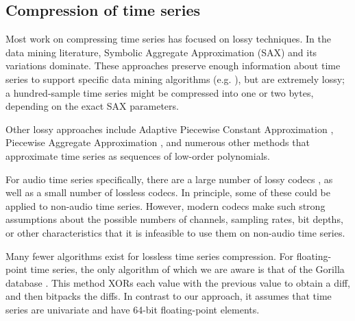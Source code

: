
\subsection{Compression of time series}

Most work on compressing time series has focused on lossy techniques. In the data mining literature, Symbolic Aggregate Approximation (SAX) \cite{SAX} and its variations \cite{isax, isax2} dominate. These approaches preserve enough information about time series to support specific data mining algorithms (e.g. \cite{fastShapelet, hotSax}), but are extremely lossy; a hundred-sample time series might be compressed into one or two bytes, depending on the exact SAX parameters.

Other lossy approaches include Adaptive Piecewise Constant Approximation \cite{apca}, Piecewise Aggregate Approximation \cite{paa}, and numerous other methods \cite{swab, lemireSegmentation, tsCompressSmartGrid} that approximate time series as sequences of low-order polynomials.

For audio time series specifically, there are a large number of lossy codecs \cite{vorbis, shorten, aac, opus}, as well as a small number of lossless \cite{flac, alac} codecs. In principle, some of these could be applied to non-audio time series. However, modern codecs make such strong assumptions about the possible numbers of channels, sampling rates, bit depths, or other characteristics that it is infeasible to use them on non-audio time series.

Many fewer algorithms exist for lossless time series compression. For floating-point time series, the only algorithm of which we are aware is that of the Gorilla database \cite{gorilla}. This method XORs each value with the previous value to obtain a diff, and then bitpacks the diffs. In contrast to our approach, it assumes that time series are univariate and have 64-bit floating-point elements. %

